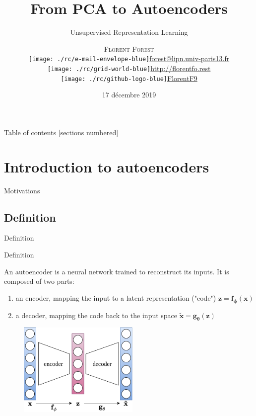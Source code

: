 \documentclass{beamer}
\title{From PCA to Autoencoders}
\subtitle{Unsupervised Representation Learning}
\date{17 décembre 2019}
\author{\textsc{Florent Forest}\vspace{0.2cm}\\
\texttt{[image: ./rc/e-mail-envelope-blue]}\;\scriptsize{\href{mailto:forest@lipn.univ-paris13.fr}{forest@lipn.univ-paris13.fr}}\\
\texttt{[image: ./rc/grid-world-blue]}\;\scriptsize{\href{http://florentfo.rest}{http://florentfo.rest}}\\
\texttt{[image: ./rc/github-logo-blue]}\;\scriptsize{\href{https://github.com/FlorentF9}{FlorentF9}}\\
}
\institute{\vfill\hfill
\texttt{[image: ./rc/logo\_supaero]}}
\begin{document}
  \maketitle

  \begin{frame}{Table of contents}
    [sections numbered]
      \tableofcontents%
  \end{frame}

  \section{Introduction to autoencoders}

  \begin{frame}{Motivations}

    \cite{Hinton2006}
    
  \end{frame}

  \subsection{Definition}

  \begin{frame}{Definition}


    \begin{exampleblock}{Definition}
      \small{
      An \alert{autoencoder} is a neural network trained to reconstruct its inputs. It is composed of two parts:
      \vspace{-0.4cm}
      \begin{enumerate}
        \item an \alert{encoder}, mapping the input to a latent representation ("code") $\mathbf{z} = \mathbf{f}_{\boldsymbol{\phi}}(\mathbf{x})$
        \item a \alert{decoder}, mapping the code back to the input space $\tilde{\mathbf{x}} = \mathbf{g}_{\boldsymbol{\theta}}(\mathbf{z})$
      \end{enumerate}
      }
    \end{exampleblock}
    \vspace{-0.25cm}
    \begin{figure}
      \includegraphics[height=4.5cm]{rc/autoencoder}
    \end{figure}

  \end{frame}
\end{document}
